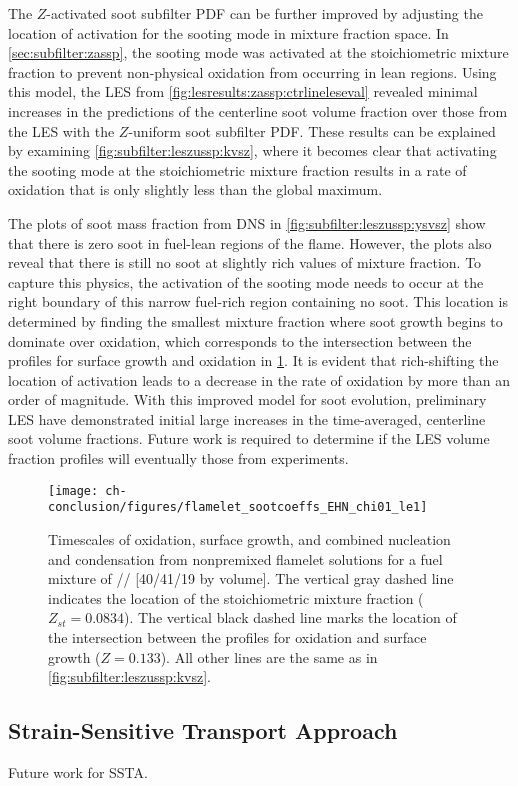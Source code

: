 The $Z$-activated soot subfilter PDF can be further improved by adjusting the location of activation for the sooting mode in mixture fraction space. In \cref{sec:subfilter:zassp}, the sooting mode was activated at the stoichiometric mixture fraction to prevent non-physical oxidation from occurring in lean regions. Using this model, the LES from \cref{fig:lesresults:zassp:ctrlineleseval} revealed minimal increases in the predictions of the centerline soot volume fraction over those from the LES with the $Z$-uniform soot subfilter PDF. These results can be explained by examining \cref{fig:subfilter:leszussp:kvsz}, where it becomes clear that activating the sooting mode at the stoichiometric mixture fraction results in a rate of oxidation that is only slightly less than the global maximum.

The plots of soot mass fraction from DNS in \cref{fig:subfilter:leszussp:ysvsz} show that there is zero soot in fuel-lean regions of the flame. However, the plots also reveal that there is still no soot at slightly rich values of mixture fraction. To capture this physics, the activation of the sooting mode needs to occur at the right boundary of this narrow fuel-rich region containing no soot. This location is determined by finding the smallest mixture fraction where soot growth begins to dominate over oxidation, which corresponds to the intersection between the profiles for surface growth and oxidation in \cref{fig:conclusion:future:zassp:shiftedz}. It is evident that rich-shifting the location of activation leads to a decrease in the rate of oxidation by more than an order of magnitude. With this improved model for soot evolution, preliminary LES have demonstrated initial large increases in the time-averaged, centerline soot volume fractions. Future work is required to determine if the LES volume fraction profiles will eventually those from experiments.

\begin{figure}[htb]
  \centering
  \texttt{[image: ch-conclusion/figures/flamelet\_sootcoeffs\_EHN\_chi01\_le1]}
  \caption[Shifted Activation of ZASSP]{Timescales of oxidation, surface growth, and combined nucleation and condensation from nonpremixed flamelet solutions for a fuel mixture of // [40/41/19 by volume]. The vertical gray dashed line indicates the location of the stoichiometric mixture fraction ($Z_{st} = 0.0834$). The vertical black dashed line marks the location of the intersection between the profiles for oxidation and surface growth ($Z = 0.133$). All other lines are the same as in \cref{fig:subfilter:leszussp:kvsz}.}
  \label{fig:conclusion:future:zassp:shiftedz}
\end{figure}


\subsection{Strain-Sensitive Transport Approach}
\label{sec:conclusion:future:ssta}

Future work for SSTA.
